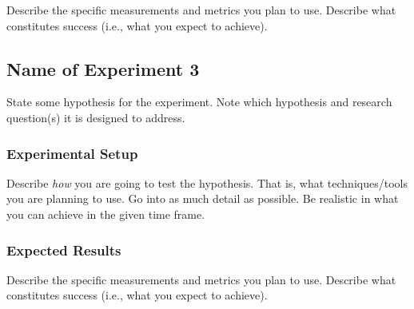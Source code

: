 \documentclass[10pt,twocolumn,pdftex]{article}
\begin{document}
Describe the specific measurements and metrics you plan to use. Describe
what constitutes success (i.e., what you expect to achieve).

\subsection{Name of Experiment 3}

State some hypothesis for the experiment. Note which hypothesis and
research question(s) it is designed to address.

\subsubsection{Experimental Setup}
Describe {\em how} you are going to test the hypothesis. That is, what
techniques/tools you are planning to use. Go into as much detail as
possible. Be realistic in what you can achieve in the given time frame.

\subsubsection{Expected Results}

Describe the specific measurements and metrics you plan to use. Describe
what constitutes success (i.e., what you expect to achieve).



\end{document}
